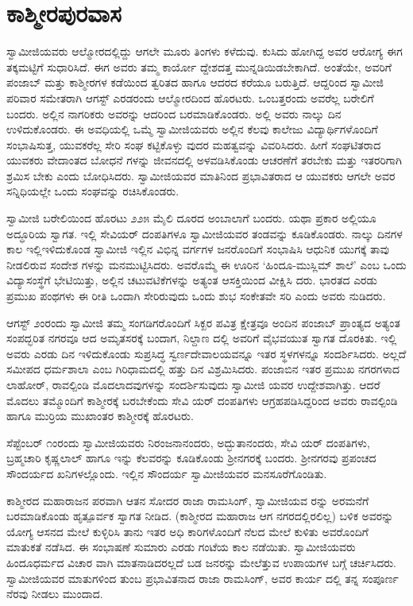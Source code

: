 
\chapter{ಕಾಶ್ಮೀರಪುರವಾಸ}

\noindent

ಸ್ವಾಮೀಜಿಯವರು ಆಲ್ಮೋರದಲ್ಲಿದ್ದು ಆಗಲೇ ಮೂರು ತಿಂಗಳು ಕಳೆದುವು. ಕುಸಿದು ಹೋಗಿದ್ದ ಅವರ ಆರೋಗ್ಯ ಈಗ ತಕ್ಕಮಟ್ಟಿಗೆ ಸುಧಾರಿಸಿದೆ. ಈಗ ಅವರು ತಮ್ಮ ಕಾರ್ಯೋ ದ್ದೇಶದತ್ತ ಮುನ್ನಡಿಯಿಡಬೇಕಾಗಿದೆ. ಅಂತೆಯೇ, ಅವರಿಗೆ ಪಂಜಾಬ್ ಮತ್ತು ಕಾಶ್ಮೀರಗಳ ಕಡೆಯಿಂದ ತ್ವರಿತದ ಹಾಗೂ ಆದರದ ಕರೆಯೂ ಬರುತ್ತಿದೆ. ಆದ್ದರಿಂದ ಸ್ವಾಮೀಜಿ ಪರಿವಾರ ಸಮೇತರಾಗಿ ಆಗಸ್ಟ್ ಎರಡರಂದು ಆಲ್ಮೋರದಿಂದ ಹೊರಟರು. ಒಂಬತ್ತರಂದು ಅವರೆಲ್ಲ ಬರೇಲಿಗೆ ಬಂದರು. ಅಲ್ಲಿನ ನಾಗರಿಕರು ಅವರನ್ನು ಆದರಿಂದ ಬರಮಾಡಿಕೊಂಡರು. ಅಲ್ಲಿ ಅವರು ನಾಲ್ಕು ದಿನ ಉಳಿದುಕೊಂಡರು. ಈ ಅವಧಿಯಲ್ಲಿ ಒಮ್ಮೆ ಸ್ವಾಮೀಜಿಯವರು ಅಲ್ಲಿನ ಕೆಲವು ಕಾಲೇಜು ವಿದ್ಯಾರ್ಥಿಗಳೊಂದಿಗೆ ಸಂಭಾಷಿಸುತ್ತ, ಯುವಕರೆಲ್ಲ ಸೇರಿ ಸಂಘ ಕಟ್ಟಿಕೊಳ್ಳು ವುದರ ಮಹತ್ವವನ್ನು ವಿವರಿಸಿದರು. ಹೀಗೆ ಸಂಘಟಿತರಾದ ಯುವಕರು ವೇದಾಂತದ ಬೋಧನೆ ಗಳನ್ನು ಜೀವನದಲ್ಲಿ ಅಳವಡಿಸಿಕೊಂಡು ಆಚರಣೆಗೆ ತರಬೇಕು ಮತ್ತು ಇತರರಿಗಾಗಿ ಶ್ರಮಿಸ ಬೇಕು ಎಂದು ಬೋಧಿಸಿದರು. ಸ್ವಾಮೀಜಿಯವರ ಮಾತಿನಿಂದ ಪ್ರಭಾವಿತರಾದ ಆ ಯುವಕರು ಆಗಲೇ ಅವರ ಸನ್ನಿಧಿಯಲ್ಲೇ ಒಂದು ಸಂಘವನ್ನು ರಚಿಸಿಕೊಂಡರು.

ಸ್ವಾಮೀಜಿ ಬರೇಲಿಯಿಂದ ಹೊರಟು ೨೨೫ ಮೈಲಿ ದೂರದ ಅಂಬಾಲಾಗೆ ಬಂದರು. ಯಥಾ ಪ್ರಕಾರ ಅಲ್ಲಿಯೂ ಅದ್ಧೂರಿಯ ಸ್ವಾಗತ. ಇಲ್ಲಿ ಸೇವಿಯರ್ ದಂಪತಿಗಳೂ ಸ್ವಾಮೀಜಿಯವರ ತಂಡವನ್ನು ಕೂಡಿಕೊಂಡರು. ನಾಲ್ಕು ದಿನಗಳ ಕಾಲ ಇಲ್ಲಿಇಳಿದುಕೊಂಡ ಸ್ವಾಮೀಜಿ ಇಲ್ಲಿನ ವಿಭಿನ್ನ ವರ್ಗಗಳ ಜನರೊಂದಿಗೆ ಸಂಭಾಷಿಸಿ ಆಧುನಿಕ ಯುಗಕ್ಕೆ ತಾವು ನೀಡಲಿರುವ ಸಂದೇಶ ಗಳನ್ನು ಮನಮುಟ್ಟಿಸಿದರು. ಅವರೊಮ್ಮೆ ಈ ಊರಿನ ‘ಹಿಂದೂ-ಮುಸ್ಲಿಮ್ ಶಾಲೆ’ ಎಂಬ ಒಂದು ವಿದ್ಯಾಸಂಸ್ಥೆಗೆ ಭೇಟಿಯಿತ್ತು, ಅಲ್ಲಿನ ಚಟುವಟಿಕೆಗಳನ್ನು ಅತ್ಯಂತ ಆಸಕ್ತಿಯಿಂದ ವೀಕ್ಷಿಸಿ ದರು. ಭಾರತದ ಎರಡು ಪ್ರಮುಖ ಪಂಥಗಳು ಈ ರೀತಿ ಒಂದಾಗಿ ಸೇರಿರುವುದು ಒಂದು ಶುಭ ಸಂಕೇತವೇ ಸರಿ ಎಂದು ಅವರು ನುಡಿದರು.

ಆಗಸ್ಟ್ ೨ಂರಂದು ಸ್ವಾಮೀಜಿ ತಮ್ಮ ಸಂಗಡಿಗರೊಂದಿಗೆ ಸಿಕ್ಖರ ಪವಿತ್ರ ಕ್ಷೇತ್ರವೂ ಅಂದಿನ ಪಂಜಾಬ್ ಪ್ರಾಂತ್ಯದ ಅತ್ಯಂತ ಸಂಪದ್ಭರಿತ ನಗರವೂ ಆದ ಅಮೃತಸರಕ್ಕೆ ಬಂದಾಗ, ನಿಲ್ದಾಣ ದಲ್ಲಿ ಅವರಿಗೆ ವೈಭವಯುತ ಸ್ವಾಗತ ದೊರಕಿತು. ಇಲ್ಲಿ ಅವರು ಎರಡು ದಿನ ಇಳಿದುಕೊಂಡು ಸುಪ್ರಸಿದ್ಧ ಸ್ವರ್ಣದೇವಾಲಯವನ್ನೂ ಇತರ ಸ್ಥಳಗಳನ್ನೂ ಸಂದರ್ಶಿಸಿದರು. ಅಲ್ಲದೆ ಸಮೀಪದ ಧರ್ಮಶಾಲಾ ಎಂಬ ಗಿರಿಧಾಮದಲ್ಲಿ ಹತ್ತು ದಿನ ವಿಶ್ರಮಿಸಿದರು. ಪಂಜಾಬಿನ ಇತರ ಪ್ರಮುಖ ನಗರಗಳಾದ ಲಾಹೋರ್, ರಾವಲ್ಪಿಂಡಿ ಮೊದಲಾದವುಗಳನ್ನು ಸಂದರ್ಶಿಸುವುದು ಸ್ವಾಮೀಜಿ ಯವರ ಉದ್ದೇಶವಾಗಿತ್ತು. ಆದರೆ ಮೊದಲು ತಮ್ಮೊಂದಿಗೆ ಕಾಶ್ಮೀರಕ್ಕೆ ಬರಬೇಕೆಂದು ಸೇವಿ ಯರ್ ದಂಪತಿಗಳು ಆಗ್ರಹಪಡಿಸಿದ್ದರಿಂದ ಅವರು ರಾವಲ್ಪಿಂಡಿ ಹಾಗೂ ಮುರ್ರಿಯ ಮುಖಾಂತರ ಕಾಶ್ಮೀರಕ್ಕೆ ಹೊರಟರು.

ಸೆಪ್ಟೆಂಬರ್ ೧ಂರಂದು ಸ್ವಾಮೀಜಿಯವರು ನಿರಂಜನಾನಂದರು, ಅದ್ಭುತಾನಂದರು, ಸೇವಿ ಯರ್ ದಂಪತಿಗಳು, ಬ್ರಹ್ಮಚಾರಿ ಕೃಷ್ಣಲಾಲ್ ಹಾಗೂ ಇನ್ನು ಕೆಲವರನ್ನು ಕೂಡಿಕೊಂಡು ಶ್ರೀನಗರಕ್ಕೆ ಬಂದರು. ಶ್ರೀನಗರವು ಪ್ರಪಂಚದ ಸೌಂದರ್ಯದ ಖನಿಗಳಲ್ಲೊಂದು. ಇಲ್ಲಿನ ಸೌಂದರ್ಯ ಸ್ವಾಮೀಜಿಯವರ ಮನಸೂರೆಗೊಂಡಿತು.

ಕಾಶ್ಮೀರದ ಮಹಾರಾಜನ ಪರವಾಗಿ ಆತನ ಸೋದರ ರಾಜಾ ರಾಮಸಿಂಗ್, ಸ್ವಾಮೀಜಿಯವ ರನ್ನು ಅರಮನೆಗೆ ಬರಮಾಡಿಕೊಂಡು ಹೃತ್ಪೂರ್ವಕ ಸ್ವಾಗತ ನೀಡಿದ. (ಕಾಶ್ಮೀರದ ಮಹಾರಾಜ ಆಗ ನಗರದಲ್ಲಿರಲಿಲ್ಲ) ಬಳಿಕ ಅವರನ್ನು ಯೋಗ್ಯ ಆಸನದ ಮೇಲೆ ಕುಳ್ಳಿರಿಸಿ ತಾನು ಇತರ ಅಧಿ ಕಾರಿಗಳೊಂದಿಗೆ ನೆಲದ ಮೇಲೆ ಕುಳಿತು ಅವರೊಂದಿಗೆ ಮಾತುಕತೆ ನಡೆಸಿದ. ಈ ಸಂಭಾಷಣೆ ಸುಮಾರು ಎರಡು ಗಂಟೆಯ ಕಾಲ ನಡೆಯಿತು. ಸ್ವಾಮೀಜಿಯವರು ಹಿಂದೂಧರ್ಮದ ವಿಚಾರ ವಾಗಿ ಮಾತನಾಡಿದರಲ್ಲದೆ ಬಡ ಜನರನ್ನು ಮೇಲೆತ್ತುವ ಉಪಾಯಗಳ ಬಗ್ಗೆ ಚರ್ಚಿಸಿದರು. ಸ್ವಾಮೀಜಿಯವರ ಮಾತುಗಳಿಂದ ತುಂಬ ಪ್ರಭಾವಿತನಾದ ರಾಜಾ ರಾಮಸಿಂಗ್, ಅವರ ಕಾರ್ಯ ದಲ್ಲಿ ತನ್ನ ಸಂಪೂರ್ಣ ನೆರವು ನೀಡಲು ಮುಂದಾದ.

